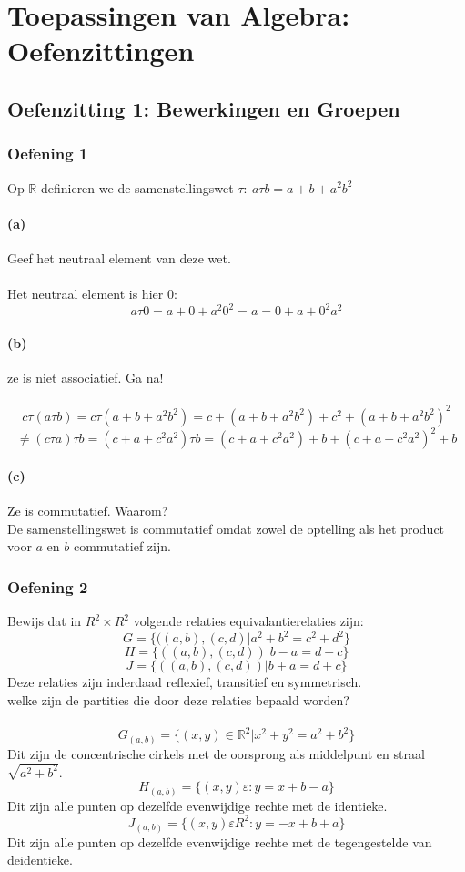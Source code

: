 \documentclass[main.tex]{subfiles}
\begin{document}
\chapter{Toepassingen van Algebra: Oefenzittingen}
\label{cha:tai-oefenzittingen}

\section{Oefenzitting 1: Bewerkingen en Groepen}

\subsection*{Oefening 1}
Op $\mathbb{R}$ definieren we de samenstellingswet $\tau:\ a\tau b = a + b + a^{2}b^{2}$
\subsubsection*{(a)}
Geef het neutraal element van deze wet.\\\\
Het neutraal element is hier $0$:
\[
a\tau 0=a+0+a^{2}0^{2}=a=0+a+0^{2}a^2
\]

\subsubsection*{(b)}
ze is niet associatief. Ga na!\\\\
\[
c \tau (a \tau b) = c \tau (a+b+a^2b^2)= c+ (a+b+a^2b^2)+c^2+(a+b+a^2b^2)^2
\]
\[
\neq (c \tau a) \tau b= (c+a+c^2a^2) \tau b= (c+a+c^2a^2)+b+(c+a+c^2a^2)^2+b
\]

\subsubsection*{(c)}
Ze is commutatief. Waarom?\\
De samenstellingswet is commutatief omdat zowel de optelling als het product voor $a$ en $b$ commutatief zijn.

\subsection*{Oefening 2}
Bewijs dat in $R^2 \times R^2$ volgende relaties equivalantierelaties zijn:
\[
G= \{((a,b),(c,d)|a^2+b^2=c^2+d^2\}
\]
\[
H=\{((a,b),(c,d))|b-a=d-c\}
\]
\[
J=\{((a,b),(c,d))|b+a=d+c\}
\]
Deze relaties zijn inderdaad reflexief, transitief en symmetrisch.\\
welke zijn de partities die door deze relaties bepaald worden?\\\\
\[
G_{(a,b)}=\{(x,y) \in \mathbb{R}^2|x^2+y^2=a^2+b^2\}
\]
Dit zijn de concentrische cirkels met de oorsprong als middelpunt en straal $\sqrt{a^2+b^2}$.
\[
H_{(a,b)}=\{(x,y) \varepsilon : y=x+b-a\}
\]
Dit zijn alle punten op dezelfde evenwijdige rechte met de identieke.
\[
J_{(a,b)}=\{(x,y) \varepsilon R^2: y=-x+b+a\}
\]
Dit zijn alle punten op dezelfde evenwijdige rechte met de tegengestelde van deidentieke.
\end{document}

